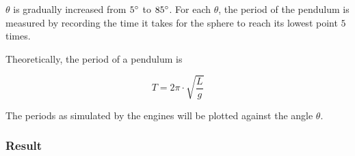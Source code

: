 \documentclass[12pt,a4paper,twoside,openright]{report}
\begin{document}
\begin{center}
\end{center}

$\theta$ is gradually increased from $5 \degree$ to $85 \degree$.
For each $\theta$, 
the period of the pendulum is measured by recording the time it takes for the sphere to reach its lowest point $5$ times.

Theoretically, the period of a pendulum is

\begin{equation}
T = 2  \pi \cdot \sqrt{\frac{L}{g}}
\end{equation}

The periods as simulated by the engines will be plotted against the angle $\theta$.

\subsubsection{Result}

\begin{figure} \label{ev4}
    \begin{center}
      \end{center}
    \end{figure}
\end{document}
